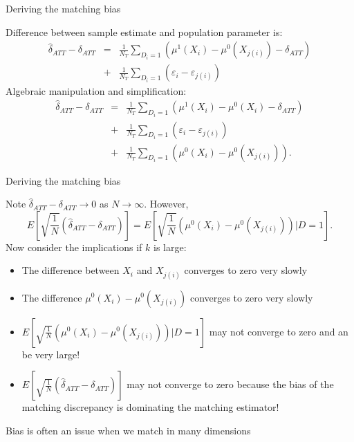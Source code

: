 \documentclass{beamer}
\begin{document}
\begin{frame}{Deriving the matching bias}
	
Difference between sample estimate and population parameter is:
		\begin{eqnarray*}
		\widehat{\delta}_{ATT} - \delta_{ATT} &=& \frac{1}{N_T} \sum_{D_i=1} \left( \mu^1(X_i) - \mu^0(X_{j(i)}) - \delta_{ATT}\right) \\
		&+& \frac{1}{N_T} \sum_{D_i=1} (\varepsilon_i - \varepsilon_{j(i)})
		\end{eqnarray*}
Algebraic manipulation and simplification:
		\begin{eqnarray*}
		\widehat{\delta}_{ATT} - \delta_{ATT} &=& \frac{1}{N_T} \sum_{D_i=1} \left( \mu^1(X_i) - \mu^0(X_i) - \delta_{ATT}\right) \\
		&+& \frac{1}{N_T} \sum_{D_i=1} (\varepsilon_i - \varepsilon_{j(i)}) \\
		&+& \frac{1}{N_T} \sum_{D_i=1} \left( \mu^0(X_i) - \mu^0(X_{j(i)}) \right).
		\end{eqnarray*}
\end{frame}


\begin{frame}{Deriving the matching bias}
	
Note $\widehat{\delta}_{ATT} - \delta_{ATT} \to 0$ as $N \to \infty$.
\pause However, 
$$E[ \sqrt{\frac{1}{N}} (\widehat{\delta}_{ATT} - \delta_{ATT})] = E[ \sqrt{\frac{1}{N}} ( \mu^0(X_i) - \mu^0(X_{j(i)}) ) | D=1].$$ 
\pause
Now consider the implications if $k$ is large:
\pause	\begin{itemize}
	\item The difference between $X_i$ and $X_{j(i)}$ converges to zero very slowly 
\pause	\item The difference $\mu^0(X_i) - \mu^0(X_{j(i)})$ converges to zero very slowly \pause
	\item $E[ \sqrt{\frac{1}{N}} (\mu^0(X_i) - \mu^0(X_{j(i)})) | D=1]$ may not converge to zero and an be very large! 
\pause	\item $E[ \sqrt{\frac{1}{N}} (\widehat{\delta}_{ATT} - \delta_{ATT})]$ may not converge to zero because the bias of the matching discrepancy is dominating the matching estimator! \pause
	\end{itemize}
 Bias is often an issue when we match in many dimensions
\end{frame}
\end{document}

